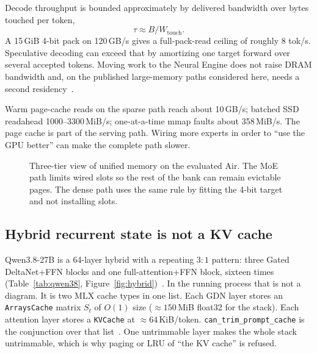 \documentclass[11pt]{article}
\theoremstyle{definition}
\newcommand{\gdn}{Gated DeltaNet}
\begin{document}
Decode throughput is bounded approximately by delivered bandwidth over bytes touched per token,
\begin{equation}
\tau \approx B / W_{\mathrm{touch}}.
\label{eq:tau}
\end{equation}
A 15\,GiB 4-bit pack on 120\,GB/s gives a full-pack-read ceiling of roughly $8$ tok/s. Speculative decoding can exceed that by amortizing one target forward over several accepted tokens. Moving work to the Neural Engine does not raise DRAM bandwidth and, on the published large-memory paths considered here, needs a second residency~\citep{weschera2026,omlx2874}.

Warm page-cache reads on the sparse path reach about 10\,GB/s; batched SSD readahead 1000--3300\,MiB/s; one-at-a-time mmap faults about 358\,MiB/s. The page cache is part of the serving path. Wiring more experts in order to ``use the GPU better'' can make the complete path slower.

\begin{figure}[t]
\centering
{}
\caption{Three-tier view of unified memory on the evaluated Air. The MoE path limits wired slots so the rest of the bank can remain evictable pages. The dense path uses the same rule by fitting the 4-bit target and not installing slots.}
\label{fig:tiers}
\end{figure}

\subsection{Hybrid recurrent state is not a KV cache}
\label{sec:hybrid}

Qwen3.8-27B is a 64-layer hybrid with a repeating $3{:}1$ pattern: three \gdn{}+FFN blocks and one full-attention+FFN block, sixteen times (Table~\ref{tab:qwen38}, Figure~\ref{fig:hybrid})~\citep{qwen38card,yang2024gateddelta}. In the running process that is not a diagram. It is two MLX cache types in one list. Each GDN layer stores an \texttt{ArraysCache} matrix $S_t$ of $O(1)$ size (${\approx}150$\,MiB float32 for the stack). Each attention layer stores a \texttt{KVCache} at ${\approx}64$\,KiB/token. \texttt{can\_trim\_prompt\_cache} is the conjunction over that list~\citep{mlxlmcache}. One untrimmable layer makes the whole stack untrimmable, which is why paging or LRU of ``the KV cache'' is refused.
\end{document}
